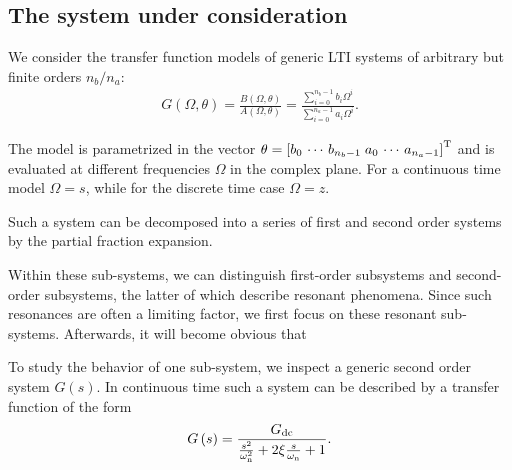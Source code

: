   \subsection{The system under consideration}
  We consider the transfer function models of generic \gls{LTI} systems of arbitrary but finite orders $n_b / n_a$:
  \begin{align}
    G\left( \Omega, \theta \right) = \frac{B\left( \Omega,\theta \right)}
                                          {A\left( \Omega,\theta \right)}
                                   = \frac{\sum\limits_{i=0}^{n_b-1} b_i \Omega^i}
                                          {\sum\limits_{i=0}^{n_a-1} a_i \Omega^i}
    \text{.} \label{eq:model}
  \end{align}
  
  The model is parametrized in the vector $\theta = \left[b_0 \,\cdots\, b_{n_b-1} \; a_0 \,\cdots\, a_{n_a-1} \right]^{\mathrm{T}}$ and  is evaluated at different frequencies $\Omega$ in the complex plane.
  For a continuous time model $\Omega = s$, while for the discrete time case $\Omega = z$.

  Such a system can be decomposed into a series of first and second order systems by the partial fraction expansion.
  
  Within these sub-systems, we can distinguish first-order subsystems and second-order subsystems, the latter of which describe resonant phenomena.
  Since such resonances are often a limiting factor, we first focus on these resonant sub-systems.
  Afterwards, it will become obvious that 

  To study the behavior of one sub-system, we inspect a generic second order system $G\left( s \right)$.
  In continuous time such a system can be described by a transfer function of the form
  \begin{equation}
    G\left(s \right) = \frac{G_{\mathrm{dc}}}
                            {             \frac{s^2}
                                               {\omega_{\mathrm{n}}^2} 
                             + 2 \xi \frac{s}
                                               {\omega_{\mathrm{n}}}
                             + 1
                            }
  \text{.}
  \label{eq:secondOrderSystemCT}
  \end{equation}

